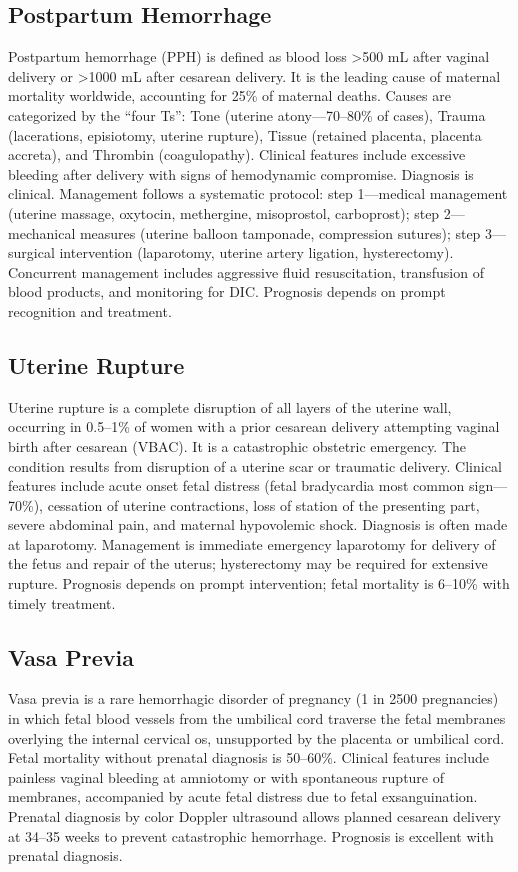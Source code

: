 \subsection{Postpartum Hemorrhage}
\label{sec:Postpartum Hemorrhage}
Postpartum hemorrhage (PPH) is defined as blood loss >500 mL after vaginal delivery or >1000 mL after cesarean delivery. It is the leading cause of maternal mortality worldwide, accounting for 25\% of maternal deaths. Causes are categorized by the ``four Ts'': Tone (uterine atony---70--80\% of cases), Trauma (lacerations, episiotomy, uterine rupture), Tissue (retained placenta, placenta accreta), and Thrombin (coagulopathy). Clinical features include excessive bleeding after delivery with signs of hemodynamic compromise. Diagnosis is clinical. Management follows a systematic protocol: step 1---medical management (uterine massage, oxytocin, methergine, misoprostol, carboprost); step 2---mechanical measures (uterine balloon tamponade, compression sutures); step 3---surgical intervention (laparotomy, uterine artery ligation, hysterectomy). Concurrent management includes aggressive fluid resuscitation, transfusion of blood products, and monitoring for DIC. Prognosis depends on prompt recognition and treatment.

\subsection{Uterine Rupture}
\label{sec:Uterine Rupture}
Uterine rupture is a complete disruption of all layers of the uterine wall, occurring in 0.5--1\% of women with a prior cesarean delivery attempting vaginal birth after cesarean (VBAC). It is a catastrophic obstetric emergency. The condition results from disruption of a uterine scar or traumatic delivery. Clinical features include acute onset fetal distress (fetal bradycardia most common sign---70\%), cessation of uterine contractions, loss of station of the presenting part, severe abdominal pain, and maternal hypovolemic shock. Diagnosis is often made at laparotomy. Management is immediate emergency laparotomy for delivery of the fetus and repair of the uterus; hysterectomy may be required for extensive rupture. Prognosis depends on prompt intervention; fetal mortality is 6--10\% with timely treatment.

\subsection{Vasa Previa}
\label{sec:Vasa Previa}
Vasa previa is a rare hemorrhagic disorder of pregnancy (1 in 2500 pregnancies) in which fetal blood vessels from the umbilical cord traverse the fetal membranes overlying the internal cervical os, unsupported by the placenta or umbilical cord. Fetal mortality without prenatal diagnosis is 50--60\%. Clinical features include painless vaginal bleeding at amniotomy or with spontaneous rupture of membranes, accompanied by acute fetal distress due to fetal exsanguination. Prenatal diagnosis by color Doppler ultrasound allows planned cesarean delivery at 34--35 weeks to prevent catastrophic hemorrhage. Prognosis is excellent with prenatal diagnosis.

